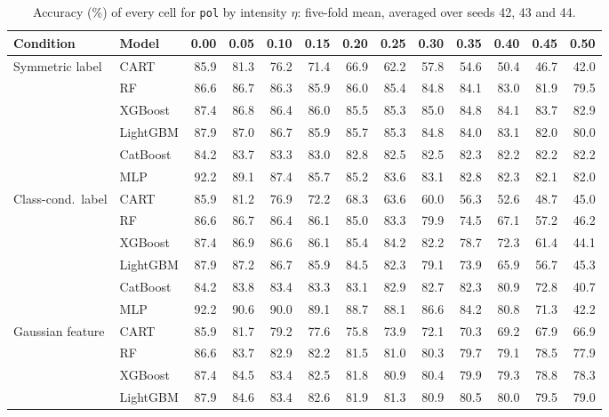 \documentclass[pdflatex,sn-mathphys]{sn-jnl}
\theoremstyle{thmstyleone}
\begin{document}
\begin{table}[htbp]
\centering
\tiny
\setlength{\tabcolsep}{2.6pt}
\caption{Accuracy (\%) of every cell for \texttt{pol} by intensity $\eta$: five-fold mean, averaged over seeds 42, 43 and 44.}
\label{tab:grid_pol}
\begin{tabular}{@{}llrrrrrrrrrrr@{}}
\toprule
Condition & Model & 0.00 & 0.05 & 0.10 & 0.15 & 0.20 & 0.25 & 0.30 & 0.35 & 0.40 & 0.45 & 0.50 \\
\midrule
Symmetric label & CART & 85.9 & 81.3 & 76.2 & 71.4 & 66.9 & 62.2 & 57.8 & 54.6 & 50.4 & 46.7 & 42.0 \\
 & RF & 86.6 & 86.7 & 86.3 & 85.9 & 86.0 & 85.4 & 84.8 & 84.1 & 83.0 & 81.9 & 79.5 \\
 & XGBoost & 87.4 & 86.8 & 86.4 & 86.0 & 85.5 & 85.3 & 85.0 & 84.8 & 84.1 & 83.7 & 82.9 \\
 & LightGBM & 87.9 & 87.0 & 86.7 & 85.9 & 85.7 & 85.3 & 84.8 & 84.0 & 83.1 & 82.0 & 80.0 \\
 & CatBoost & 84.2 & 83.7 & 83.3 & 83.0 & 82.8 & 82.5 & 82.5 & 82.3 & 82.2 & 82.2 & 82.2 \\
 & MLP & 92.2 & 89.1 & 87.4 & 85.7 & 85.2 & 83.6 & 83.1 & 82.8 & 82.3 & 82.1 & 82.0 \\
\midrule
Class-cond.\ label & CART & 85.9 & 81.2 & 76.9 & 72.2 & 68.3 & 63.6 & 60.0 & 56.3 & 52.6 & 48.7 & 45.0 \\
 & RF & 86.6 & 86.7 & 86.4 & 86.1 & 85.0 & 83.3 & 79.9 & 74.5 & 67.1 & 57.2 & 46.2 \\
 & XGBoost & 87.4 & 86.9 & 86.6 & 86.1 & 85.4 & 84.2 & 82.2 & 78.7 & 72.3 & 61.4 & 44.1 \\
 & LightGBM & 87.9 & 87.2 & 86.7 & 85.9 & 84.5 & 82.3 & 79.1 & 73.9 & 65.9 & 56.7 & 45.3 \\
 & CatBoost & 84.2 & 83.8 & 83.4 & 83.3 & 83.1 & 82.9 & 82.7 & 82.3 & 80.9 & 72.8 & 40.7 \\
 & MLP & 92.2 & 90.6 & 90.0 & 89.1 & 88.7 & 88.1 & 86.6 & 84.2 & 80.8 & 71.3 & 42.2 \\
\midrule
Gaussian feature & CART & 85.9 & 81.7 & 79.2 & 77.6 & 75.8 & 73.9 & 72.1 & 70.3 & 69.2 & 67.9 & 66.9 \\
 & RF & 86.6 & 83.7 & 82.9 & 82.2 & 81.5 & 81.0 & 80.3 & 79.7 & 79.1 & 78.5 & 77.9 \\
 & XGBoost & 87.4 & 84.5 & 83.4 & 82.5 & 81.8 & 80.9 & 80.4 & 79.9 & 79.3 & 78.8 & 78.3 \\
 & LightGBM & 87.9 & 84.6 & 83.4 & 82.6 & 81.9 & 81.3 & 80.9 & 80.5 & 80.0 & 79.5 & 79.0 \\

\end{tabular}
\end{table}
\end{document}
